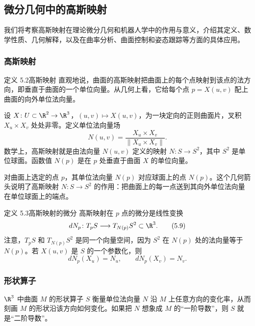\subsection{微分几何中的高斯映射}
我们将考察高斯映射在理论微分几何和机器人学中的作用与意义，介绍其定义、数学性质、几何解释，以及在曲率分析、曲面控制和姿态跟踪等方面的具体应用。

\subsubsection{高斯映射}
\begin{statement}{定义 5.2}{高斯映射}
直观地说，曲面的高斯映射把曲面上的每个点映射到该点的法方向，即垂直于曲面的一个单位向量。从几何上看，它给每个点 $p=X(u,v)$ 配上曲面的向外单位法向量。

设 $X\colon U\subset\R^2\to\R^3$，$(u,v)\mapsto X(u,v)$，为一块定向的正则曲面片，叉积 $X_u\times X_v$ 处处非零。定义单位法向量场
\[
  N(u,v)=\frac{X_u\times X_v}{\lVert X_u\times X_v\rVert}.
\]
数学上，高斯映射就是由法向量 $N(u,v)$ 定义的映射 $N\colon S\to S^2$，其中 $S^2$ 是单位球面。函数值 $N(p)$ 是在 $p$ 处垂直于曲面 $X$ 的单位向量。

对曲面上选定的点 $p$，其单位法向量 $N(p)$ 对应球面上的点 $N(p)$。这个几何箭头说明了高斯映射 $N\colon S\to S^2$ 的作用：把曲面上的每一点送到其向外单位法向量在单位球面上的端点。
\end{statement}

\begin{statement}{定义 5.3}{高斯映射的微分}
高斯映射在 $p$ 点的微分是线性变换
\begin{equation*}
  dN_p\colon T_pS\longrightarrow T_{N(p)}S^2\subset\R^3.
  \tag{5.9}\label{eq:5.9}
\end{equation*}
注意，$T_pS$ 和 $T_{N(p)}S^2$ 是同一个向量空间，因为 $S^2$ 在 $N(p)$ 处的法向量等于 $N(p)$。若 $X(u,v)$ 是 $S$ 的一个参数化，则
\[
  dN_p(X_u)=N_u,\qquad dN_p(X_v)=N_v.
\]
\end{statement}

\subsubsection{形状算子}
$\R^3$ 中曲面 $M$ 的形状算子 $S$ 衡量单位法向量 $N$ 沿 $M$ 上任意方向的变化率，从而刻画 $M$ 的形状沿该方向如何变化。如果把 $N$ 想象成 $M$ 的“一阶导数”，则 $S$ 就是“二阶导数”。


